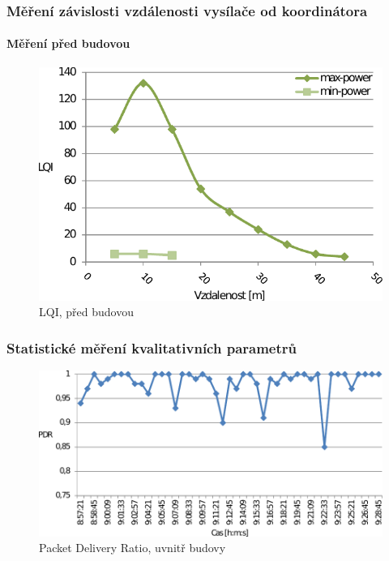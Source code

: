 \documentclass{beamer}
\begin{document}
	\begin{frame}
	\frametitle{Měření závislosti vzdálenosti vysílače od koordinátora}
	\framesubtitle{Měření před budovou}
	\begin{figure}[!ht]
	\centering%
	\includegraphics[scale=0.7, keepaspectratio]{2-lqi-venku}%
	\caption{LQI, před budovou}
	\end{figure}
	\end{frame}

	\begin{frame}
	\frametitle{Statistické měření kvalitativních parametrů}
	\begin{figure}[!ht]
	\centering%
	\includegraphics[scale=0.7, keepaspectratio]{3-pdr}%
	\caption{Packet Delivery Ratio, uvnitř budovy}
	\end{figure}
	\end{frame}
\end{document}
